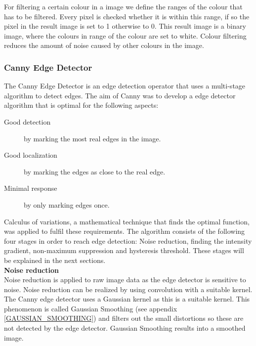 \documentclass[a4paper]{article}
\begin{document}
For filtering a certain colour in a image we define the ranges of the colour that has to be filtered. Every pixel is checked whether it is within this range, if so the pixel in the result image is set to 1 otherwise to 0. This result image is a binary image, where the colours in range of the colour are set to white. Colour filtering reduces the amount of noise caused by other colours in the image.

\subsubsection{Canny Edge Detector}
The Canny Edge Detector \cite{Canny1986} is an edge detection operator that uses a multi-stage algorithm to detect edges. The aim of Canny was to develop a edge detector algorithm that is optimal for the following aspects:
\begin{description}
\item[Good detection] by marking the most real edges in the image.
\item[Good localization] by marking the edges as close to the real edge.
\item[Minimal response] by only marking edges once.
\end{description}
Calculus of variations, a mathematical technique that finds the optimal function, was applied to fulfil these requirements. The algorithm consists of the following four stages in order to reach edge detection: Noise reduction, finding the intensity gradient, non-maximum suppression and hysteresis threshold. These stages will be explained in the next sections.\\

\noindent\textbf{Noise reduction}\\
Noise reduction is applied to raw image data as the edge detector is sensitive to noise. Noise reduction can be realized by using convolution with a suitable kernel. The Canny edge detector uses a Gaussian kernel as this is a suitable kernel. This phenomenon is called Gaussian Smoothing (see appendix \ref{GAUSSIAN_SMOOTHING}) and filters out the small distortions so these are not detected by the edge detector. Gaussian Smoothing results into a smoothed image.\\
\end{document}
